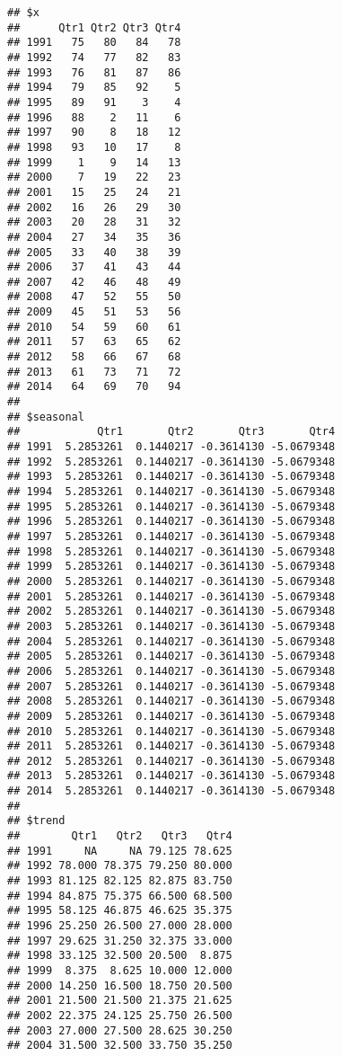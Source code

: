 \documentclass[]{article}
\begin{document}
\begin{verbatim}
## $x
##      Qtr1 Qtr2 Qtr3 Qtr4
## 1991   75   80   84   78
## 1992   74   77   82   83
## 1993   76   81   87   86
## 1994   79   85   92    5
## 1995   89   91    3    4
## 1996   88    2   11    6
## 1997   90    8   18   12
## 1998   93   10   17    8
## 1999    1    9   14   13
## 2000    7   19   22   23
## 2001   15   25   24   21
## 2002   16   26   29   30
## 2003   20   28   31   32
## 2004   27   34   35   36
## 2005   33   40   38   39
## 2006   37   41   43   44
## 2007   42   46   48   49
## 2008   47   52   55   50
## 2009   45   51   53   56
## 2010   54   59   60   61
## 2011   57   63   65   62
## 2012   58   66   67   68
## 2013   61   73   71   72
## 2014   64   69   70   94
## 
## $seasonal
##            Qtr1       Qtr2       Qtr3       Qtr4
## 1991  5.2853261  0.1440217 -0.3614130 -5.0679348
## 1992  5.2853261  0.1440217 -0.3614130 -5.0679348
## 1993  5.2853261  0.1440217 -0.3614130 -5.0679348
## 1994  5.2853261  0.1440217 -0.3614130 -5.0679348
## 1995  5.2853261  0.1440217 -0.3614130 -5.0679348
## 1996  5.2853261  0.1440217 -0.3614130 -5.0679348
## 1997  5.2853261  0.1440217 -0.3614130 -5.0679348
## 1998  5.2853261  0.1440217 -0.3614130 -5.0679348
## 1999  5.2853261  0.1440217 -0.3614130 -5.0679348
## 2000  5.2853261  0.1440217 -0.3614130 -5.0679348
## 2001  5.2853261  0.1440217 -0.3614130 -5.0679348
## 2002  5.2853261  0.1440217 -0.3614130 -5.0679348
## 2003  5.2853261  0.1440217 -0.3614130 -5.0679348
## 2004  5.2853261  0.1440217 -0.3614130 -5.0679348
## 2005  5.2853261  0.1440217 -0.3614130 -5.0679348
## 2006  5.2853261  0.1440217 -0.3614130 -5.0679348
## 2007  5.2853261  0.1440217 -0.3614130 -5.0679348
## 2008  5.2853261  0.1440217 -0.3614130 -5.0679348
## 2009  5.2853261  0.1440217 -0.3614130 -5.0679348
## 2010  5.2853261  0.1440217 -0.3614130 -5.0679348
## 2011  5.2853261  0.1440217 -0.3614130 -5.0679348
## 2012  5.2853261  0.1440217 -0.3614130 -5.0679348
## 2013  5.2853261  0.1440217 -0.3614130 -5.0679348
## 2014  5.2853261  0.1440217 -0.3614130 -5.0679348
## 
## $trend
##        Qtr1   Qtr2   Qtr3   Qtr4
## 1991     NA     NA 79.125 78.625
## 1992 78.000 78.375 79.250 80.000
## 1993 81.125 82.125 82.875 83.750
## 1994 84.875 75.375 66.500 68.500
## 1995 58.125 46.875 46.625 35.375
## 1996 25.250 26.500 27.000 28.000
## 1997 29.625 31.250 32.375 33.000
## 1998 33.125 32.500 20.500  8.875
## 1999  8.375  8.625 10.000 12.000
## 2000 14.250 16.500 18.750 20.500
## 2001 21.500 21.500 21.375 21.625
## 2002 22.375 24.125 25.750 26.500
## 2003 27.000 27.500 28.625 30.250
## 2004 31.500 32.500 33.750 35.250

\end{verbatim}
\end{document}
